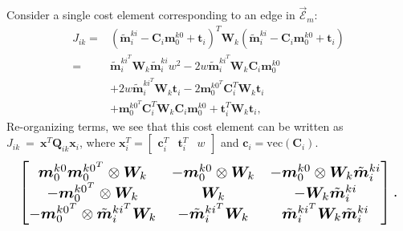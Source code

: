 \documentclass[lettersize,journal]{IEEEtran}
\newcommand{\EdgeSet}{\vec{\bm{\mathcal{E}}}}
\newcommand{\vect}[1]{\mbox{vec}(#1)}
\begin{document}
Consider a single cost element corresponding to an edge in $\EdgeSet_m $:
\begin{align*}
	J_{ik}=&(\tilde{\bm{m}}_i^{ki} - \bm{C}_i\bm{m}_0^{k0} + \bm{t}_i)^T \bm{W}_k (\tilde{\bm{m}}_i^{ki} - \bm{C}_i\bm{m}_0^{k0} + \bm{t}_i) \\
	=& \tilde{\bm{m}}_i^{ki^T}\bm{W}_k\tilde{\bm{m}}_i^{ki} w^2 - 2 w\tilde{\bm{m}}_i^{ki^T}\bm{W}_k\bm{C}_i\bm{m}_0^{k0}  \\
	&+ 2 w\tilde{\bm{m}}_i^{ki^T}\bm{W}_k\bm{t}_i -2\bm{m}_0^{k0^T}\bm{C}_i^T\bm{W}_k\bm{t}_i\\
	& + \bm{m}_0^{k0^T}\bm{C}_i^T\bm{W}_k\bm{C}_i\bm{m}_0^{k0} + \bm{t}_i^T\bm{W}_k\bm{t}_i,
\end{align*}
Re-organizing terms, we see that this cost element can be written as $J_{ik}~=~\bm{x}^T\bm{Q}_{ik}\bm{x}_i$, where $ \bm{x}_i^T = \begin{bmatrix} \bm{c}_i^T &  \bm{t}_i^T & w \end{bmatrix} $ and $ \bm{c}_i=\vect{\bm{C}_i} $.
\begin{equation*}
	\resizebox{0.98\columnwidth}{!}{$\begin{bmatrix}
			\bm{m}_0^{k0}\bm{m}_0^{k0^T} \otimes \bm{W}_k  & -\bm{m}_0^{k0}\otimes\bm{W}_k & -\bm{m}_0^{k0}\otimes\bm{W}_k\tilde{\bm{m}}_i^{ki}\\
			 -\bm{m}_0^{k0^T}\otimes\bm{W}_k & \bm{W}_k & -\bm{W}_k\tilde{\bm{m}}_i^{ki} \\
			-\bm{m}_0^{k0^T}\otimes\tilde{\bm{m}}_i^{ki^T}\bm{W}_k & -\tilde{\bm{m}}_i^{ki^T}\bm{W}_k & \tilde{\bm{m}}_i^{ki^T}\bm{W}_k\tilde{\bm{m}}_i^{ki}
		\end{bmatrix}.$}
\end{equation*}
\end{document}
